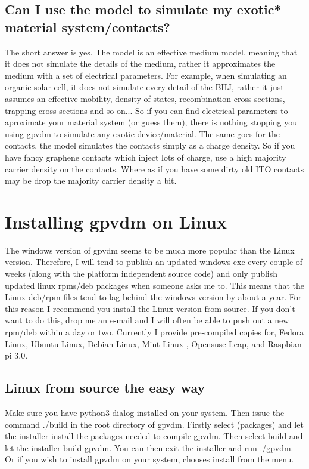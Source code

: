 \documentclass[11pt]{article}
\begin{document}
\subsection{Can I use the model to simulate my exotic* material system/contacts?}
The short answer is yes.  The model is an effective medium model, meaning that it does not simulate the details of the medium, rather it approximates the medium with a set of electrical parameters.  For example, when simulating an organic solar cell, it does not simulate every detail of the BHJ, rather it just assumes an effective mobility, density of states, recombination cross sections, trapping cross sections and so on...  So if you can find electrical parameters to aproximate your material system (or guess them), there is nothing stopping you using gpvdm to simulate any exotic device/material.  The same goes for the contacts, the model simulates the contacts simply as a charge density. So if you have fancy graphene contacts which inject lots of charge, use a high majority carrier density on the contacts.  Where as if you have some dirty old ITO contacts may be drop the majority carrier density a bit.

\section{Installing gpvdm on Linux} \label{installing_on_linux}
The windows version of gpvdm seems to be much more popular than the Linux version.  Therefore, I will tend to publish an updated windows exe every couple of weeks (along with the platform independent source code) and only publish updated linux rpms/deb packages when someone asks me to.  This means that the Linux deb/rpm files tend to lag behind the windows version by about a year.  For this reason I recommend you install the Linux version from source.  If you don't want to do this, drop me an e-mail and I will often be able to push out a new rpm/deb within a day or two.  Currently I provide pre-compiled copies for, Fedora Linux, Ubuntu Linux, Debian Linux, Mint Linux , Opensuse Leap, and Raspbian pi 3.0.


\subsection{Linux from source the easy way}
Make sure you have python3-dialog installed on your system.  Then issue the command ./build in the root directory of gpvdm.  Firstly select (packages) and let the installer install the packages needed to compile gpvdm.  Then select build and let the installer build gpvdm.  You can then exit the installer and run ./gpvdm.  Or if you wish to install gpvdm on your system, chooses install from the menu.
\end{document}
